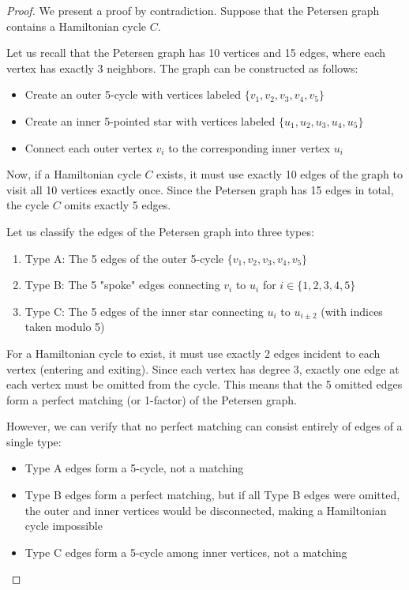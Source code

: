 \documentclass{article}
\theoremstyle{definition}
\begin{document}
\begin{proof}
We present a proof by contradiction. Suppose that the Petersen graph contains a Hamiltonian cycle $C$.

Let us recall that the Petersen graph has 10 vertices and 15 edges, where each vertex has exactly 3 neighbors. The graph can be constructed as follows:
\begin{itemize}
    \item Create an outer 5-cycle with vertices labeled $\{v_1, v_2, v_3, v_4, v_5\}$
    \item Create an inner 5-pointed star with vertices labeled $\{u_1, u_2, u_3, u_4, u_5\}$
    \item Connect each outer vertex $v_i$ to the corresponding inner vertex $u_i$
\end{itemize}

Now, if a Hamiltonian cycle $C$ exists, it must use exactly 10 edges of the graph to visit all 10 vertices exactly once. Since the Petersen graph has 15 edges in total, the cycle $C$ omits exactly 5 edges.

Let us classify the edges of the Petersen graph into three types:
\begin{enumerate}
    \item Type A: The 5 edges of the outer 5-cycle $\{v_1, v_2, v_3, v_4, v_5\}$
    \item Type B: The 5 "spoke" edges connecting $v_i$ to $u_i$ for $i \in \{1,2,3,4,5\}$
    \item Type C: The 5 edges of the inner star connecting $u_i$ to $u_{i \pm 2}$ (with indices taken modulo 5)
\end{enumerate}

For a Hamiltonian cycle to exist, it must use exactly 2 edges incident to each vertex (entering and exiting). Since each vertex has degree 3, exactly one edge at each vertex must be omitted from the cycle. This means that the 5 omitted edges form a perfect matching (or 1-factor) of the Petersen graph.

However, we can verify that no perfect matching can consist entirely of edges of a single type:
\begin{itemize}
    \item Type A edges form a 5-cycle, not a matching
    \item Type B edges form a perfect matching, but if all Type B edges were omitted, the outer and inner vertices would be disconnected, making a Hamiltonian cycle impossible
    \item Type C edges form a 5-cycle among inner vertices, not a matching
\end{itemize}


\end{proof}
\end{document}
